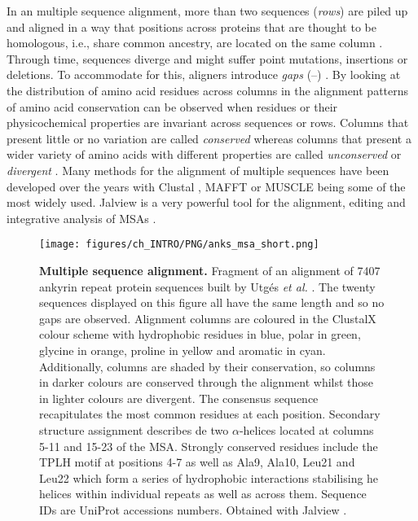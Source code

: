 In an multiple sequence alignment, more than two sequences (\textit{rows}) are piled up and aligned in a way that positions across proteins that are thought to be homologous, i.e., share common ancestry, are located on the same column \cite{NEEDLEMAN_1970_MSA}. Through time, sequences diverge and might suffer point mutations, insertions or deletions. To accommodate for this, aligners introduce \textit{gaps} (--) \cite{SMITH_1981_MSA}. By looking at the distribution of amino acid residues across columns in the alignment patterns of amino acid conservation can be observed when residues or their physicochemical properties are invariant across sequences or rows. Columns that present little or no variation are called \textit{conserved} whereas columns that present a wider variety of amino acids with different properties are called \textit{unconserved} or \textit{divergent} \cite{LIVINGSTONE_1993_CONS}. Many methods for the alignment of multiple sequences have been developed over the years with Clustal \cite{HIGGINS_1988_CLUSTAL, HIGGINS_1992_CLUSTALV, THOMPSON_1994_CLUSTALW, JEANMOUGIN_1998_CLUSTALX, SIEVERS_2011_CLUSTALO}, MAFFT \cite{KATOH_2002_MAFFT, KATOH_2008_MAFFT, KATOH_2013_MAFFT} or MUSCLE \cite{EDGAR_2004_MUSCLE, EDGAR_2022_MUSCLE5} being some of the most widely used. Jalview is a very powerful tool for the alignment, editing and integrative analysis of MSAs \cite{WATERHOUSE_2009_JALVIEW}.

\begin{figure}[htb!]
    \centering
    \texttt{[image: figures/ch\_INTRO/PNG/anks\_msa\_short.png]}
    \caption[Multiple sequence alignment]{\textbf{Multiple sequence alignment.} Fragment of an alignment of 7407 ankyrin repeat protein sequences built by Utgés \textit{et al.} \cite{UTGES_2021_ANKS}. The twenty sequences displayed on this figure all have the same length and so no gaps are observed. Alignment columns are coloured in the ClustalX colour scheme \cite{JEANMOUGIN_1998_CLUSTALX} with hydrophobic residues in blue, polar in green, glycine in orange, proline in yellow and aromatic in cyan. Additionally, columns are shaded by their conservation, so columns in darker colours are conserved through the alignment whilst those in lighter colours are divergent. The consensus sequence recapitulates the most common residues at each position. Secondary structure assignment describes de two $\alpha$-helices located at columns 5-11 and 15-23 of the MSA. Strongly conserved residues include the TPLH motif at positions 4-7 as well as Ala9, Ala10, Leu21 and Leu22 which form a series of hydrophobic interactions stabilising he helices within individual repeats as well as across them. Sequence IDs are UniProt accessions numbers. Obtained with Jalview \cite{WATERHOUSE_2009_JALVIEW}.}
    \label{fig:MSA}
\end{figure}


